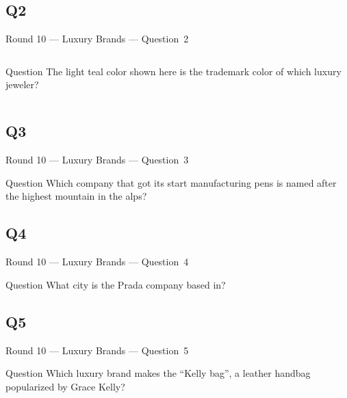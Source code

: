 \documentclass[11pt]{beamer}
\begin{document}
\subsection*{Q2}
\begin{frame}[t]{Round 10 --- Luxury Brands --- \mbox{Question 2}}
\vspace{-0.5em}
\begin{columns}[T,totalwidth=\linewidth]
\begin{column}{0.37\linewidth}
\begin{block}{Question}
The light teal color shown here is the trademark color of which luxury jeweler?
\end{block}
\end{column}
\begin{column}{0.62\linewidth}
\begin{center}
\texttt{[image: \{Images/tiffany]}.png}
\end{center}
\end{column}
\end{columns}
\end{frame}
\subsection*{Q3}
\begin{frame}[t]{Round 10 --- Luxury Brands --- \mbox{Question 3}}
\vspace{-0.5em}
\begin{block}{Question}
Which company that got its start manufacturing pens is named after the highest mountain in the alps?
\end{block}
\end{frame}
\subsection*{Q4}
\begin{frame}[t]{Round 10 --- Luxury Brands --- \mbox{Question 4}}
\vspace{-0.5em}
\begin{block}{Question}
What city is the Prada company based in?
\end{block}
\end{frame}
\subsection*{Q5}
\begin{frame}[t]{Round 10 --- Luxury Brands --- \mbox{Question 5}}
\vspace{-0.5em}
\begin{block}{Question}
Which luxury brand makes the ``Kelly bag'', a leather handbag popularized by Grace Kelly?
\end{block}
\end{frame}
\end{document}
